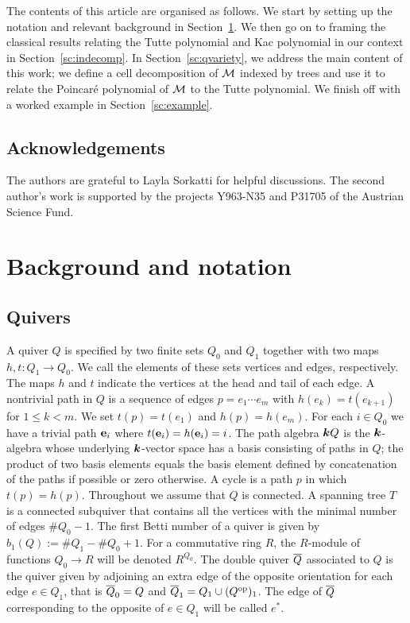 \documentclass{amsart}
\theoremstyle{definition}
\begin{document}
The contents of this article are organised as follows.
We start by setting up the notation and relevant background in Section~\ref{sc:back}. We then go on to framing the classical results relating the Tutte polynomial and Kac polynomial in our context in Section~\ref{sc:indecomp}.
In Section~\ref{sc:qvariety}, we address the main content of this work; we define a cell decomposition of $\mathcal{M}$ indexed by trees and use it to relate the Poincar\'e polynomial of $\mathcal{M}$ to the Tutte polynomial. 
We finish off with a worked example in Section~\ref{sc:example}.

\subsection*{Acknowledgements}
The authors are grateful to Layla Sorkatti for helpful discussions. The second author's work is supported by the projects Y963-N35 and P31705 of the Austrian Science Fund.

\section{Background and notation}\label{sc:back}
\subsection{Quivers}
A quiver $Q$ is specified by two finite sets $Q_0$ and $Q_1$ together with two maps $h, t \colon Q_1 \rightarrow Q_0$. We call the elements of these sets vertices and edges, respectively.  The maps $h$ and $t$ indicate the vertices at the head and tail of each edge.
A nontrivial path in $Q$ is a sequence of edges $p = e_1 \dotsb e_m$ with $h(e_{k}) = t(e_{k+1})$ for $1 \leq k < m$.  We set $t(p) = t(e_{1})$ and $h(p)= h(e_m)$.  
For each $i \in Q_0$ we have a trivial path $\mathbf{e}_i$ where $t(\mathbf{e}_i) = h(\mathbf{e}_i) = i$.  
The path algebra ${\boldsymbol{k}} Q$ is the ${\boldsymbol{k}}$-algebra whose underlying ${\boldsymbol{k}}$-vector space has a basis consisting of paths in $Q$; the product of two basis elements equals the basis element defined by concatenation of the paths if possible or zero otherwise.  
A cycle is a path $p$ in which $t(p) = h(p)$. Throughout we assume that $Q$ is connected.
A spanning tree $T$ is a connected subquiver that contains all the vertices with the minimal number of edges $\#Q_0-1$.
The first Betti number of a quiver is given by $b_1(Q):= \#Q_1 - \#Q_0 + 1$.
For a commutative ring $R$, the $R$-module of functions $Q_0 \rightarrow R$ will be denoted $R^{Q_0}$.
The double quiver ${\overline{Q}}$ associated to $Q$ is the quiver given by adjoining an extra edge of the opposite orientation for each edge $e \in Q_1$, that is ${\overline{Q}}_0 = Q$ and ${\overline{Q}}_1= Q_1 \cup (Q^\text{op})_1$.
The edge of ${\overline{Q}}$ corresponding to the opposite of $e \in Q_1$ will be called $e^*$.
\end{document}
